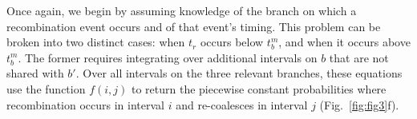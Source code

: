 \documentclass[11pt]{article}
\begin{document}
Once again, we begin by assuming knowledge of the branch on which a 
recombination event occurs and of that event's timing. This problem can be broken 
into two distinct cases: when $t_r$ occurs below $t_b^m$, and when it 
occurs above $t_b^m$. The former requires integrating over additional 
intervals on $b$ that are not shared with $b'$. Over all intervals
on the three relevant branches, these equations use the function 
$f(i,j)$ to return the piecewise constant probabilities where recombination 
occurs in interval $i$ and re-coalesces in interval $j$ (Fig.~\ref{fig:fig3}f).









\end{document}
